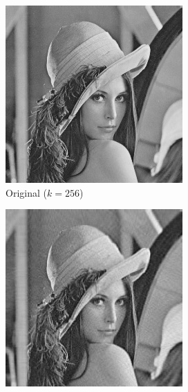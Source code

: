 \documentclass[a4paper]{article}
\begin{document}
\begin{figure}[H]
\centering
        \begin{subfigure}[b]{0.22\textwidth}
                \centering
                \includegraphics[width=\linewidth]{original}
                \caption{Original ($k=256$)}
                \label{fig:original}
        \end{subfigure}\hfill
        \begin{subfigure}[b]{0.22\textwidth}
                \centering
                \includegraphics[width=\linewidth]{compressed60}

\end{subfigure}
\end{figure}
\end{document}
